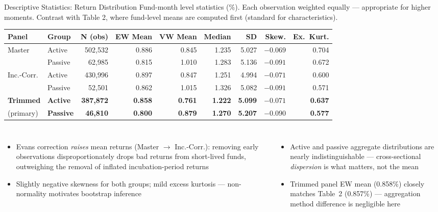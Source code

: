 \documentclass[aspectratio=169,10pt]{beamer}
\begin{document}
\begin{frame}{Descriptive Statistics: Return Distribution}
{\scriptsize Fund-month level statistics (\%). Each observation weighted equally — appropriate for higher moments. Contrast with Table 2, where fund-level means are computed first (standard for characteristics).}
\vspace{2pt}
\begin{center}
\setlength{\tabcolsep}{4.5pt}
\scriptsize
\begin{tabular}{llrrrrrrr}
\toprule
\textbf{Panel} & \textbf{Group} & \textbf{N (obs)} & \textbf{EW Mean} & \textbf{VW Mean} & \textbf{Median} & \textbf{SD} & \textbf{Skew.} & \textbf{Ex.\ Kurt.}\\
\midrule
\multirow{2}{*}{Master}
  & Active  & 502,532 & 0.886 & 0.845 & 1.235 & 5.027 & $-0.069$ & 0.704 \\
  & Passive & \phantom{0}62,985 & 0.815 & 1.010 & 1.283 & 5.136 & $-0.091$ & 0.672 \\
\midrule
\multirow{2}{*}{Inc.-Corr.}
  & Active  & 430,996 & 0.897 & 0.847 & 1.251 & 4.994 & $-0.071$ & 0.600 \\
  & Passive & \phantom{0}52,501 & 0.862 & 1.015 & 1.326 & 5.082 & $-0.091$ & 0.571 \\
\midrule
\textbf{Trimmed} & \textbf{Active}  & \textbf{387,872} & \textbf{0.858} & \textbf{0.761} & \textbf{1.222} & \textbf{5.099} & $\mathbf{-0.071}$ & \textbf{0.637} \\
(primary) & \textbf{Passive} & \phantom{0}\textbf{46,810} & \textbf{0.800} & \textbf{0.879} & \textbf{1.270} & \textbf{5.207} & $\mathbf{-0.090}$ & \textbf{0.577} \\
\bottomrule
\end{tabular}
\end{center}
\vspace{3pt}
\begin{columns}[T]
\begin{itemize}\scriptsize
  \item Evans correction \emph{raises} mean returns (Master $\to$ Inc.-Corr.): removing early observations disproportionately drops bad returns from short-lived funds, outweighing the removal of inflated incubation-period returns
  \item Slightly negative skewness for both groups; mild excess kurtosis — non-normality motivates bootstrap inference
\end{itemize}
\begin{itemize}\scriptsize
  \item Active and passive aggregate distributions are nearly indistinguishable — cross-sectional \emph{dispersion} is what matters, not the mean
  \item Trimmed panel EW mean (0.858\%) closely matches Table~2 (0.857\%) — aggregation method difference is negligible here
\end{itemize}
\end{columns}
\end{frame}
\end{document}
